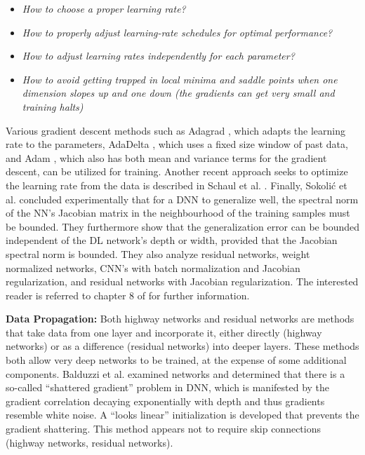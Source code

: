\documentclass[12pt]{spieman}
\begin{document}
\begin{spacing}{1}
\begin{itemize}
    \setlength{\parskip}{0pt}
    \setlength{\itemsep}{0pt plus 1pt}
    \item \textit{How to choose a proper learning rate?} 
    \item \textit{How to properly adjust learning-rate schedules for optimal performance? }
    \item \textit{How to adjust learning rates independently for each parameter?}
    \item \textit{How to avoid getting trapped in local minima and saddle points when one dimension slopes up and one down (the gradients can get very small and training halts)}
\end{itemize}

Various gradient descent methods such as Adagrad \cite{duchi2011adaptive} , which adapts the learning rate to the parameters, AdaDelta \cite{zeiler2012adadelta} , which uses a fixed size window of past data, and Adam \cite{kingma2014adam} , which also has both mean and variance terms for the gradient descent, can be utilized for training. Another recent approach seeks to optimize the learning rate from the data is described in Schaul et al. \cite{Schaul2013NoMore} . Finally, Sokoli\'{c} et al. \cite{sokolic2016robust} concluded experimentally that for a DNN to generalize well, the spectral norm of the NN's Jacobian matrix in the neighbourhood of the training samples must be bounded. They furthermore show that the generalization error can be bounded independent of the DL network's depth or width, provided that the Jacobian spectral norm is bounded. They also analyze residual networks, weight normalized networks, CNN's with batch normalization and Jacobian regularization, and residual networks with Jacobian regularization. The interested reader is referred to chapter 8 of \cite{goodfellow2016deep} for further information.

\textbf{Data Propagation:} Both highway networks \cite{srivastava2015highway} and residual networks \cite{he2015deep} are methods that take data from one layer and incorporate it, either directly (highway networks) or as a difference (residual networks) into deeper layers. These methods both allow very deep networks to be trained, at the expense of some additional components. Balduzzi et al. \cite{balduzzi2016neural} examined networks and determined that there is a so-called ``shattered gradient'' problem in DNN, which is manifested by the gradient correlation decaying exponentially with depth and thus gradients resemble white noise. A ``looks linear'' initialization is developed that prevents the gradient shattering. This method appears not to require skip connections (highway networks, residual networks).



\end{spacing}
\end{document}

